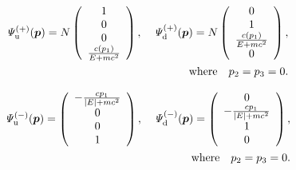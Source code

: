 \documentclass[%
 reprint,
 amsmath,amssymb,
 aps,
]{revtex4-1}
\numberwithin{equation}{section}%
\begin{document}
        \begin{align}
            {\it\Psi^{(+)}_{\mathrm{u}}} (\bm{p})
            = N
            \left( 
                \begin{array}{c}
                    1 \\
                    0 \\
                    0 \\
                    \frac{c ( p_1 ) }{E + m c^{2}} \\
                \end{array}
            \right)
            , \ \ \
            {\it\Psi^{(+)}_{\mathrm{d}}} (\bm{p})
            = N
            \left( 
                \begin{array}{c}
                    0 \\
                    1 \\
                    \frac{c ( p_1 ) }{E + m c^{2}} \\
                    0  \\
                \end{array}
            \right)
            ,
            \notag
            \\
            \mathrm{where} \ \ \ p_2 = p_3 = 0
            .
        \label{e_Psy_8}
        \end{align}


        \begin{align}
            {\it\Psi^{(-)}_{\mathrm{u}}} (\bm{p})
            =
            \left( 
                \begin{array}{c}
                    - \frac{c p_1 }{|E| + m c^{2}} \\
                    0  \\
                    0 \\
                    1 \\
                \end{array}
            \right)
            , \ \ \
            {\it\Psi^{(-)}_{\mathrm{d}}} (\bm{p})
            =
            \left( 
                \begin{array}{c}
                    0 \\
                    - \frac{c p_1 }{|E| + m c^{2}} \\
                    1 \\
                    0 \\
                \end{array}
            \right)
            ,
            \notag
            \\
            \mathrm{where} \ \ \ p_2 = p_3 = 0
            .
        \label{e_Psy_9}
        \end{align}
\end{document}
